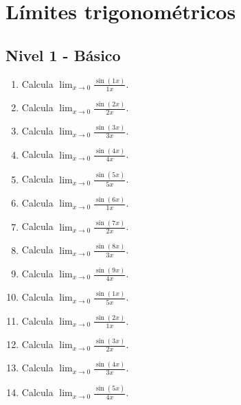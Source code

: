 \documentclass[11pt,a4paper]{article}
\begin{document}
\newpage

\section{Límites trigonométricos}

\subsection{Nivel 1 - Básico}

\begin{enumerate}[label=\textbf{E\arabic*.},start=401]

\item Calcula $\displaystyle\lim_{x\to0}\frac{\sin(1x)}{1x}$.

\item Calcula $\displaystyle\lim_{x\to0}\frac{\sin(2x)}{2x}$.

\item Calcula $\displaystyle\lim_{x\to0}\frac{\sin(3x)}{3x}$.

\item Calcula $\displaystyle\lim_{x\to0}\frac{\sin(4x)}{4x}$.

\item Calcula $\displaystyle\lim_{x\to0}\frac{\sin(5x)}{5x}$.

\item Calcula $\displaystyle\lim_{x\to0}\frac{\sin(6x)}{1x}$.

\item Calcula $\displaystyle\lim_{x\to0}\frac{\sin(7x)}{2x}$.

\item Calcula $\displaystyle\lim_{x\to0}\frac{\sin(8x)}{3x}$.

\item Calcula $\displaystyle\lim_{x\to0}\frac{\sin(9x)}{4x}$.

\item Calcula $\displaystyle\lim_{x\to0}\frac{\sin(1x)}{5x}$.

\item Calcula $\displaystyle\lim_{x\to0}\frac{\sin(2x)}{1x}$.

\item Calcula $\displaystyle\lim_{x\to0}\frac{\sin(3x)}{2x}$.

\item Calcula $\displaystyle\lim_{x\to0}\frac{\sin(4x)}{3x}$.

\item Calcula $\displaystyle\lim_{x\to0}\frac{\sin(5x)}{4x}$.


\end{enumerate}
\end{document}
